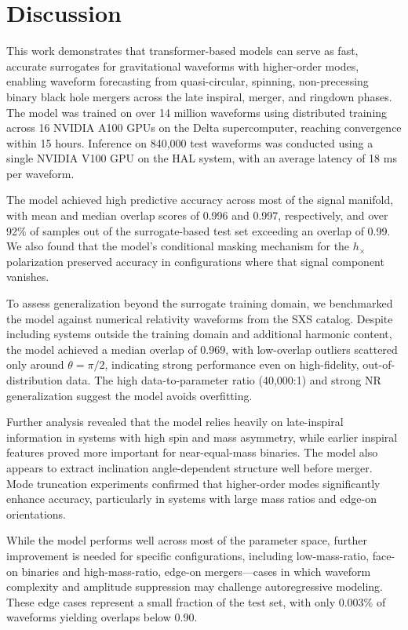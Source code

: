 \documentclass[12pt]{iopart}
\begin{document}
\section{Discussion}
\label{sec:end}

This work demonstrates that transformer-based models can serve as fast, accurate surrogates for gravitational waveforms with higher-order modes, enabling waveform forecasting from quasi-circular, spinning, non-precessing binary black hole mergers across the late inspiral, merger, and ringdown phases. The model was trained on over 14 million waveforms using distributed training across 16 NVIDIA A100 GPUs on the Delta supercomputer, reaching convergence within 15 hours. Inference on 840,000 test waveforms was conducted using a single NVIDIA V100 GPU on the HAL system, with an average latency of 18 ms per waveform.

The model achieved high predictive accuracy across most of the signal manifold, with mean and median overlap scores of 0.996 and 0.997, respectively, and over 92$\%$ of samples out of the surrogate-based test set exceeding an overlap of 0.99. We also found that the model's conditional masking mechanism for the $h_{\times}$ polarization preserved accuracy in configurations where that signal component vanishes. 

To assess generalization beyond the surrogate training domain, we benchmarked the model against numerical relativity waveforms from the SXS catalog. Despite including systems outside the training domain and additional harmonic content, the model achieved a median overlap of 0.969, with low-overlap outliers scattered only around $\theta=\pi/2$, indicating strong performance even on high-fidelity, out-of-distribution data. The high data-to-parameter ratio (40,000:1) and strong NR generalization suggest the model avoids overfitting. 

Further analysis revealed that the model relies heavily on late-inspiral information in systems with high spin and mass asymmetry, while earlier inspiral features proved more important for near-equal-mass binaries. The model also appears to extract inclination angle-dependent structure well before merger. Mode truncation experiments confirmed that higher-order modes significantly enhance accuracy, particularly in systems with large mass ratios and edge-on orientations. 

While the model performs well across most of the parameter space, further improvement is needed for specific configurations, including low-mass-ratio, face-on binaries and high-mass-ratio, edge-on mergers—cases in which waveform complexity and amplitude suppression may challenge autoregressive modeling. These edge cases represent a small fraction of the test set, with only 0.003$\%$ of waveforms yielding overlaps below 0.90.
\end{document}
